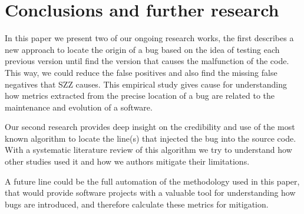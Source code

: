 \documentclass[a4paper]{article}
\begin{document}
\section{Conclusions and further research}

In this paper we present two of our ongoing research works, the first describes a new approach to locate the origin of a bug based on the idea of testing each previous version until find the version that causes the malfunction of the code. This way, we could reduce the false positives and also find the missing false negatives that SZZ causes. This empirical study gives cause for understanding how metrics extracted from the precise location of a bug are related to the maintenance and evolution of a software.

Our second research provides deep insight on the credibility and use of the most known algorithm to locate the line(s) that injected the bug into the source code. With a systematic literature review of this algorithm we try to understand how other studies used it and how we authors mitigate their limitations.

A future line could be the full automation of the methodology used in this paper, that would provide software projects with a valuable tool for understanding how bugs are introduced, and therefore calculate these metrics for mitigation.

% 
%
\end{document}

